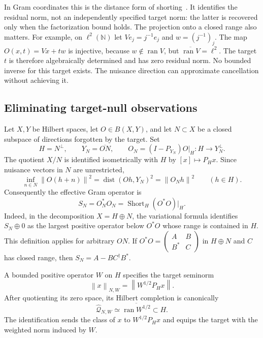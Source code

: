 \documentclass[11pt,a4paper]{amsart}
\numberwithin{equation}{section}
\theoremstyle{definition}
\theoremstyle{remark}
\newcommand{\N}{\mathbb N}
\DeclareMathOperator{\ran}{ran}
\DeclareMathOperator{\dist}{dist}
\newcommand{\norm}[1]{\left\lVert#1\right\rVert}
\begin{document}
In Gram coordinates this is the distance form of shorting~\cite{AT,Ando}. It identifies the residual norm, not an independently specified target norm: the latter is recovered only when the factorization bound holds. The projection onto a closed range also matters. For example, on $\ell^2(\N)$ let $Ve_j=j^{-1}e_j$ and $w=(j^{-1})_j$. The map $O(x,t)=Vx+tw$ is injective, because $w\notin\ran V$, but $\overline{\ran V}=\ell^2$. The target $t$ is therefore algebraically determined and has zero residual norm. No bounded inverse for this target exists. The nuisance direction can approximate cancellation without achieving it.

\subsection{Eliminating target-null observations}
Let $X,Y$ be Hilbert spaces, let $O\in B(X,Y)$, and let $N\subset X$ be a closed subspace of directions forgotten by the target. Set
\[
 H=N^\perp,\qquad Y_N=\overline{ON},\qquad
 O_N=(I-P_{Y_N})O|_H:H\longrightarrow Y_N^\perp.
\]
The quotient $X/N$ is identified isometrically with $H$ by $[x]\mapsto P_Hx$. Since nuisance vectors in $N$ are unrestricted,
\begin{equation}\label{eq:target_short_variation}
 \inf_{n\in N}\norm{O(h+n)}^2
 =\dist(Oh,Y_N)^2=\norm{O_Nh}^2\qquad(h\in H).
\end{equation}
Consequently the effective Gram operator is
\begin{equation}\label{eq:target_short_gram}
 S_N=O_N^*O_N=\operatorname{Short}_{H}(O^*O)|_H.
\end{equation}
Indeed, in the decomposition $X=H\oplus N$, the variational formula identifies $S_N\oplus0$ as the largest positive operator below $O^*O$ whose range is contained in $H$. This definition applies for arbitrary $ON$. If
$O^*O=\left(\begin{smallmatrix}A&B\\B^*&C\end{smallmatrix}\right)$
in $H\oplus N$ and $C$ has closed range, then $S_N=A-BC^\dagger B^*$.

A bounded positive operator $W$ on $H$ specifies the target seminorm
\[
 \norm{x}_{N,W}=\norm{W^{1/2}P_Hx}.
\]
After quotienting its zero space, its Hilbert completion is canonically
\begin{equation}\label{eq:target_weight_completion}
 \widehat{\mathcal Q}_{N,W}\simeq\overline{\ran W^{1/2}}\subset H.
\end{equation}
The identification sends the class of $x$ to $W^{1/2}P_Hx$ and equips the target with the weighted norm induced by $W$.
\end{document}
